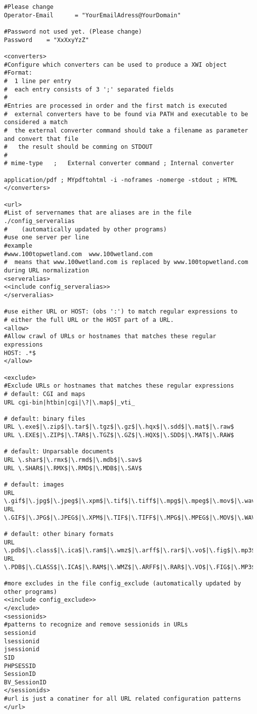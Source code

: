 \begin{verbatim}
#Please change
Operator-Email      = "YourEmailAdress@YourDomain"

#Password not used yet. (Please change)
Password    = "XxXxyYzZ"

<converters>
#Configure which converters can be used to produce a XWI object
#Format:
#  1 line per entry
#  each entry consists of 3 ';' separated fields
#
#Entries are processed in order and the first match is executed
#  external converters have to be found via PATH and executable to be considered a match
#  the external converter command should take a filename as parameter and convert that file
#   the result should be comming on STDOUT
#
# mime-type   ;   External converter command ; Internal converter

application/pdf ; MYpdftohtml -i -noframes -nomerge -stdout ; HTML
</converters>

<url>
#List of servernames that are aliases are in the file ./config_serveralias
#    (automatically updated by other programs)
#use one server per line
#example
#www.100topwetland.com  www.100wetland.com
#  means that www.100wetland.com is replaced by www.100topwetland.com during URL normalization
<serveralias>
<<include config_serveralias>>
</serveralias>

#use either URL or HOST: (obs ':') to match regular expressions to
# either the full URL or the HOST part of a URL.
<allow>
#Allow crawl of URLs or hostnames that matches these regular expressions
HOST: .*$
</allow>

<exclude>
#Exclude URLs or hostnames that matches these regular expressions
# default: CGI and maps
URL cgi-bin|htbin|cgi|\?|\.map$|_vti_

# default: binary files
URL \.exe$|\.zip$|\.tar$|\.tgz$|\.gz$|\.hqx$|\.sdd$|\.mat$|\.raw$
URL \.EXE$|\.ZIP$|\.TAR$|\.TGZ$|\.GZ$|\.HQX$|\.SDD$|\.MAT$|\.RAW$

# default: Unparsable documents
URL \.shar$|\.rmx$|\.rmd$|\.mdb$|\.sav$
URL \.SHAR$|\.RMX$|\.RMD$|\.MDB$|\.SAV$

# default: images
URL \.gif$|\.jpg$|\.jpeg$|\.xpm$|\.tif$|\.tiff$|\.mpg$|\.mpeg$|\.mov$|\.wav$|\.au$|\.pcx$|\.xbm$|\.tga$|\.psd$
URL \.GIF$|\.JPG$|\.JPEG$|\.XPM$|\.TIF$|\.TIFF$|\.MPG$|\.MPEG$|\.MOV$|\.WAV$|\.AU$|\.PCX$|\.XBM$|\.TGA$|\.PSD$

# default: other binary formats
URL \.pdb$|\.class$|\.ica$|\.ram$|\.wmz$|\.arff$|\.rar$|\.vo$|\.fig$|\.mp3$|\.wmv$|\.avi$|\.msi$
URL \.PDB$|\.CLASS$|\.ICA$|\.RAM$|\.WMZ$|\.ARFF$|\.RAR$|\.VO$|\.FIG$|\.MP3$|\.WMV$|\.AVI$|\.MSI$

#more excludes in the file config_exclude (automatically updated by other programs)
<<include config_exclude>>
</exclude>
<sessionids>
#patterns to recognize and remove sessionids in URLs
sessionid
lsessionid
jsessionid
SID
PHPSESSID
SessionID
BV_SessionID
</sessionids>
#url is just a conatiner for all URL related configuration patterns
</url>
\end{verbatim}
